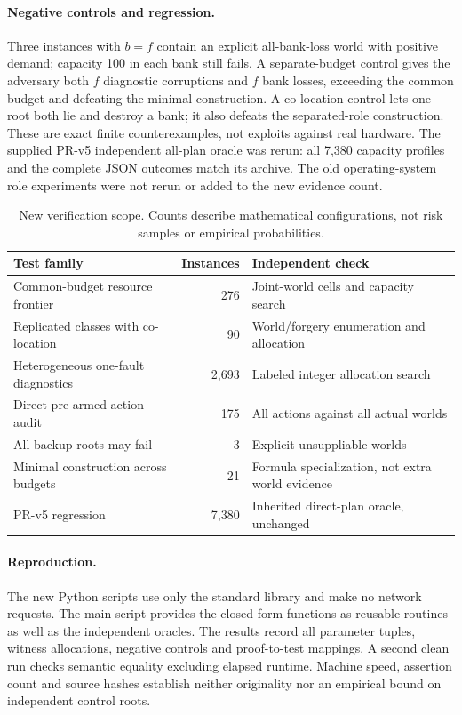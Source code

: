 \paragraph{Negative controls and regression.}
Three instances with $b=f$ contain an explicit all-bank-loss world with positive demand; capacity 100 in each bank still fails. A separate-budget control gives the adversary both $f$ diagnostic corruptions and $f$ bank losses, exceeding the common budget and defeating the minimal construction. A co-location control lets one root both lie and destroy a bank; it also defeats the separated-role construction. These are exact finite counterexamples, not exploits against real hardware. The supplied PR-v5 independent all-plan oracle was rerun: all 7,380 capacity profiles and the complete JSON outcomes match its archive. The old operating-system role experiments were not rerun or added to the new evidence count.

\begin{table}[t]
\centering\small
\caption{New verification scope. Counts describe mathematical configurations, not risk samples or empirical probabilities.}
\begin{tabularx}{\linewidth}{@{}XrX@{}}\toprule
Test family&Instances&Independent check\\\midrule
Common-budget resource frontier&276&Joint-world cells and capacity search\\
Replicated classes with co-location&90&World/forgery enumeration and allocation\\
Heterogeneous one-fault diagnostics&2,693&Labeled integer allocation search\\
Direct pre-armed action audit&175&All actions against all actual worlds\\
All backup roots may fail&3&Explicit unsuppliable worlds\\
Minimal construction across budgets&21&Formula specialization, not extra world evidence\\
PR-v5 regression&7,380&Inherited direct-plan oracle, unchanged\\\bottomrule
\end{tabularx}
\end{table}

\paragraph{Reproduction.}
The new Python scripts use only the standard library and make no network requests. The main script provides the closed-form functions as reusable routines as well as the independent oracles. The results record all parameter tuples, witness allocations, negative controls and proof-to-test mappings. A second clean run checks semantic equality excluding elapsed runtime. Machine speed, assertion count and source hashes establish neither originality nor an empirical bound on independent control roots.

